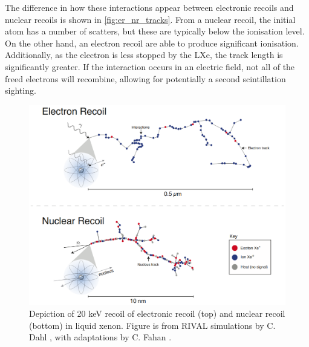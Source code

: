 \par
The difference in how these interactions appear between electronic recoils and nuclear recoils is shown in \autoref{fig:er_nr_tracks}.
From a nuclear recoil, the initial atom has a number of scatters, but these are typically below the ionisation level.
On the other hand, an electron recoil are able to produce significant ionisation.
Additionally, as the electron is less stopped by the LXe, the track length is significantly greater.
If the interaction occurs in an electric field, not all of the freed electrons will recombine, allowing for potentially a second scintillation sighting.

\begin{figure}
    \centering
    \includegraphics[width=\textwidth]{Figures/LZ/er_nr_tracks.png}
    \caption[Depiction of a 20 keV recoil on liquid xenon]{Depiction of 20 keV recoil of electronic recoil (top) and nuclear recoil (bottom) in liquid xenon.
    Figure is from RIVAL simulations by C. Dahl \cite{carldahl_thesis_ref}, with adaptations by C. Fahan \cite{carlosfahan_thesis_ref}.}
    \label{fig:er_nr_tracks}
\end{figure}

